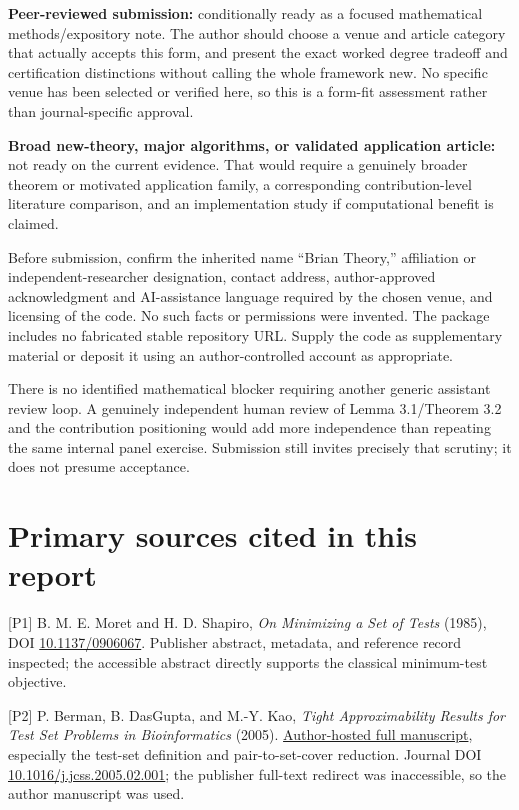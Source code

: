\documentclass[
  11pt,
]{article}
\begin{document}
\textbf{Peer-reviewed submission:} conditionally ready as a focused
mathematical methods/expository note. The author should choose a venue
and article category that actually accepts this form, and present the
exact worked degree tradeoff and certification distinctions without
calling the whole framework new. No specific venue has been selected or
verified here, so this is a form-fit assessment rather than
journal-specific approval.

\textbf{Broad new-theory, major algorithms, or validated application
article:} not ready on the current evidence. That would require a
genuinely broader theorem or motivated application family, a
corresponding contribution-level literature comparison, and an
implementation study if computational benefit is claimed.

Before submission, confirm the inherited name ``Brian Theory,''
affiliation or independent-researcher designation, contact address,
author-approved acknowledgment and AI-assistance language required by
the chosen venue, and licensing of the code. No such facts or
permissions were invented. The package includes no fabricated stable
repository URL. Supply the code as supplementary material or deposit it
using an author-controlled account as appropriate.

There is no identified mathematical blocker requiring another generic
assistant review loop. A genuinely independent human review of Lemma
3.1/Theorem 3.2 and the contribution positioning would add more
independence than repeating the same internal panel exercise. Submission
still invites precisely that scrutiny; it does not presume acceptance.

\section{Primary sources cited in this
report}\label{primary-sources-cited-in-this-report}

{[}P1{]} B. M. E. Moret and H. D. Shapiro, \emph{On Minimizing a Set of
Tests} (1985), DOI
\href{https://doi.org/10.1137/0906067}{10.1137/0906067}. Publisher
abstract, metadata, and reference record inspected; the accessible
abstract directly supports the classical minimum-test objective.

{[}P2{]} P. Berman, B. DasGupta, and M.-Y. Kao, \emph{Tight
Approximability Results for Test Set Problems in Bioinformatics} (2005).
\href{https://bdasgup.github.io/resume/publ/papers/barcode-journal.pdf}{Author-hosted
full manuscript}, especially the test-set definition and
pair-to-set-cover reduction. Journal DOI
\href{https://doi.org/10.1016/j.jcss.2005.02.001}{10.1016/j.jcss.2005.02.001};
the publisher full-text redirect was inaccessible, so the author
manuscript was used.
\end{document}
